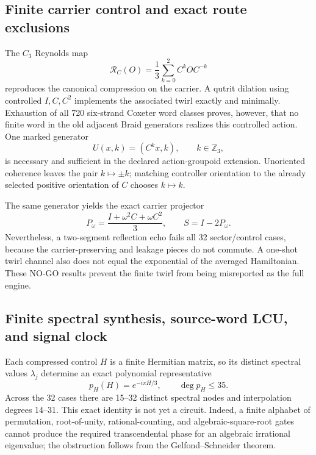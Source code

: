 \documentclass[11pt]{article}
\theoremstyle{definition}
\theoremstyle{remark}
\begin{document}
\subsection{Finite carrier control and exact route exclusions}

The $C_3$ Reynolds map
\begin{equation}
 \mathcal R_C(O)=\frac13\sum_{k=0}^2 C^kOC^{-k}
\end{equation}
reproduces the canonical compression on the carrier. A qutrit dilation using controlled $I,C,C^2$ implements the associated twirl exactly and minimally. Exhaustion of all 720 six-strand Coxeter word classes proves, however, that no finite word in the old adjacent Braid generators realizes this controlled action. One marked generator
\begin{equation}
 U(x,k)=(C^kx,k),\qquad k\in\mathbb Z_3,
\end{equation}
is necessary and sufficient in the declared action-groupoid extension. Unoriented coherence leaves the pair $k\mapsto\pm k$; matching controller orientation to the already selected positive orientation of $C$ chooses $k\mapsto k$.

The same generator yields the exact carrier projector
\begin{equation}
 P_\omega=\frac{I+\omega^2C+\omega C^2}{3},\qquad
 S=I-2P_\omega.
\end{equation}
Nevertheless, a two-segment reflection echo fails all 32 sector/control cases, because the carrier-preserving and leakage pieces do not commute. A one-shot twirl channel also does not equal the exponential of the averaged Hamiltonian. These NO-GO results prevent the finite twirl from being misreported as the full engine.

\subsection{Finite spectral synthesis, source-word LCU, and signal clock}

Each compressed control $H$ is a finite Hermitian matrix, so its distinct spectral values $\lambda_j$ determine an exact polynomial representative
\begin{equation}
 p_H(H)=e^{-i\pi H/3},\qquad \deg p_H\le35.
 \label{eq:spectralpoly091}
\end{equation}
Across the 32 cases there are 15--32 distinct spectral nodes and interpolation degrees 14--31. This exact identity is not yet a circuit. Indeed, a finite alphabet of permutation, root-of-unity, rational-counting, and algebraic-square-root gates cannot produce the required transcendental phase for an algebraic irrational eigenvalue; the obstruction follows from the Gelfond--Schneider theorem.
\end{document}
